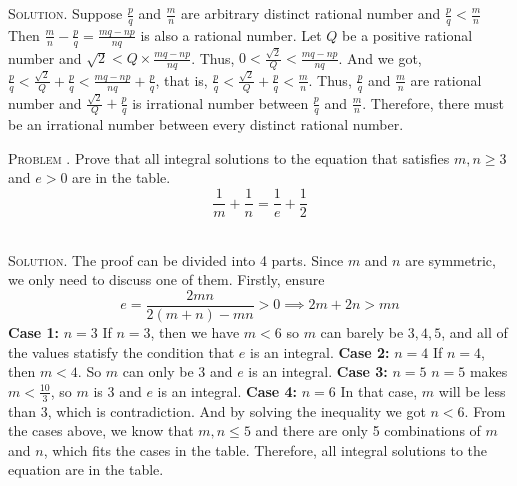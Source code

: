 \documentclass[12pt, a4paper, oneside]{article}
\newcounter{problemname}
\newenvironment{problem}{\stepcounter{problemname}\par\noindent\textsc{Problem \arabic{problemname}. }}{\\\par}
\newenvironment{solution}{\par\noindent\textsc{Solution. }}{\\\par}
\begin{document}
\begin{solution}
    \newline Suppose $\frac{p}{q}$ and $\frac{m}{n}$ are arbitrary distinct rational number and $\frac{p}{q} < \frac{m}{n}$
    \newline Then $\frac{m}{n} - \frac{p}{q} = \frac{mq - np}{nq}$ is also a rational number.
    \newline Let $Q$ be a positive rational number and $\sqrt{2} < Q\times \frac{mq - np}{nq}$.
    \newline Thus, $0 < \frac{\sqrt{2}}{Q} < \frac{mq - np}{nq}$.
    \newline And we got, $\frac{p}{q} < \frac{\sqrt{2}}{Q} + \frac{p}{q} < \frac{mq - np}{nq} + \frac{p}{q}$,
    that is, $\frac{p}{q} < \frac{\sqrt{2}}{Q} + \frac{p}{q} < \frac{m}{n}$.
    \newline Thus, $\frac{p}{q}$ and $\frac{m}{n}$ are rational number and $\frac{\sqrt{2}}{Q} + \frac{p}{q}$ is irrational number between $\frac{p}{q}$ and $\frac{m}{n}$.
    \newline Therefore, there must be an irrational number between every distinct rational number.
\end{solution}

\begin{problem}
  Prove that all integral solutions to the equation that satisfies $m,n \ge 3$ and $e > 0$ are in the table.
  \begin{equation*}
    \frac{1}{m} + \frac{1}{n} = \frac{1}{e} + \frac{1}{2}
  \end{equation*}
\end{problem}

\begin{solution}
    The proof can be divided into 4 parts. Since $m$ and $n$ are symmetric, we only need to discuss one of them. Firstly, ensure\newline
    \begin{equation*}
        e = \frac{2mn}{2(m+n)-mn} > 0 \implies 2m + 2n > mn
    \end{equation*}
    \textbf{Case 1: } $n = 3$ \newline
    If $n = 3$, then we have $m < 6$ so $m$ can barely be $3, 4, 5$, and all of the values statisfy the condition that $e$ is an integral.\newline
    \textbf{Case 2: } $n = 4$ \newline
    If $n = 4$, then $m < 4$. So $m$ can only be 3 and $e$ is an integral.\newline
    \textbf{Case 3: } $n = 5$ \newline
    $n = 5$ makes $m < \frac{10}{3}$, so $m$ is 3 and $e$ is an integral.\newline
    \textbf{Case 4: } $n = 6$ \newline
    In that case, $m$ will be less than 3, which is contradiction. And by solving the inequality we got $n < 6$.\newline
    From the cases above, we know that $m, n \le 5$ and there are only 5 combinations of $m$ and $n$, which fits the cases in the table.
    Therefore, all integral solutions to the equation are in the table.
\end{solution}
\end{document}
